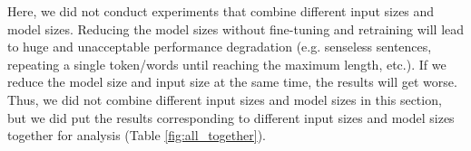 \documentclass[11pt]{article}
\begin{document}
\begin{table}[h]
    \centering
    \caption{Benchmarking results for all experiments.}
    \label{tab:model_parameters}
\end{table}

Here, we did not conduct experiments that combine different input sizes and model sizes. Reducing the model sizes without fine-tuning and retraining will lead to huge and unacceptable performance degradation (e.g. senseless sentences, repeating a single token/words until reaching the maximum length, etc.). If we reduce the model size and input size at the same time, the results will get worse. Thus, we did not combine different input sizes and model sizes in this section, but we did put the results corresponding to different input sizes and model sizes together for analysis (Table \ref{fig:all_together}).
\end{document}
